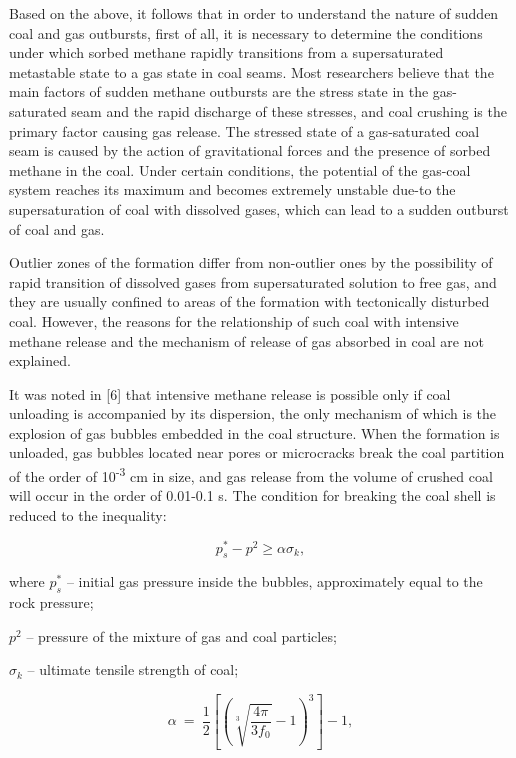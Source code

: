 \begin{multicols}{2}
Based on the above, it follows that in order to understand the nature of
sudden coal and gas outbursts, first of all, it is necessary to
determine the conditions under which sorbed methane rapidly transitions
from a supersaturated metastable state to a gas state in coal seams.
Most researchers believe that the main factors of sudden methane
outbursts are the stress state in the gas-saturated seam and the rapid
discharge of these stresses, and coal crushing is the primary factor
causing gas release. The stressed state of a gas-saturated coal seam is
caused by the action of gravitational forces and the presence of sorbed
methane in the coal. Under certain conditions, the potential of the
gas-coal system reaches its maximum and becomes extremely unstable
due-to the supersaturation of coal with dissolved gases, which can lead
to a sudden outburst of coal and gas.

Outlier zones of the formation differ from non-outlier ones by the
possibility of rapid transition of dissolved gases from supersaturated
solution to free gas, and they are usually confined to areas of the
formation with tectonically disturbed coal. However, the reasons for the
relationship of such coal with intensive methane release and the
mechanism of release of gas absorbed in coal are not explained.

It was noted in {[}6{]} that intensive methane release is possible only
if coal unloading is accompanied by its dispersion, the only mechanism
of which is the explosion of gas bubbles embedded in the coal structure.
When the formation is unloaded, gas bubbles located near pores or
microcracks break the coal partition of the order of
10\textsuperscript{-3} cm in size, and gas release from the volume of
crushed coal will occur in the order of 0.01-0.1 s. The condition for
breaking the coal shell is reduced to the inequality:

\begin{equation}
p_s^* - p^2 \geq \alpha \sigma_k,
\end{equation}

where $p_s^*$ -- initial gas pressure inside the
bubbles, approximately equal to the rock pressure;

$p^2$ -- pressure of the mixture of gas and coal
particles;

$\sigma_k$ -- ultimate tensile strength of coal;

\begin{equation}
\alpha\  = \ \frac{1}{2}\left\lbrack \left( \sqrt[3]{\frac{4\pi}{3f_{0}}} - 1 \right)^{3} \right\rbrack - 1,
\end{equation}


\end{multicols}
